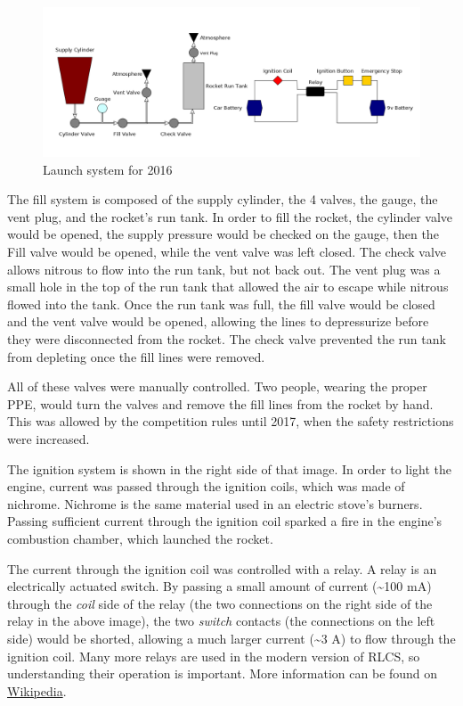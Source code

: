 \documentclass[11pt]{article}
\begin{document}
\begin{figure}[htbp]
\centering
\includegraphics[width=.9\linewidth]{./images/old_system.png}
\caption{\label{fig:orgc1b79f2}
Launch system for 2016}
\end{figure}

The fill system is composed of the supply cylinder, the 4 valves, the gauge, the
vent plug, and the rocket's run tank. In order to fill the rocket, the cylinder
valve would be opened, the supply pressure would be checked on the gauge, then
the Fill valve would be opened, while the vent valve was left closed. The check
valve allows nitrous to flow into the run tank, but not back out. The vent plug
was a small hole in the top of the run tank that allowed the air to escape while
nitrous flowed into the tank. Once the run tank was full, the fill valve would
be closed and the vent valve would be opened, allowing the lines to depressurize
before they were disconnected from the rocket. The check valve prevented the run
tank from depleting once the fill lines were removed.

All of these valves were manually controlled. Two people, wearing the proper
PPE, would turn the valves and remove the fill lines from the rocket by
hand. This was allowed by the competition rules until 2017, when the safety
restrictions were increased.

The ignition system is shown in the right side of that image. In order to light
the engine, current was passed through the ignition coils, which was made of
nichrome. Nichrome is the same material used in an electric stove's
burners. Passing sufficient current through the ignition coil sparked a fire in
the engine's combustion chamber, which launched the rocket.

The current through the ignition coil was controlled with a relay. A relay is
an electrically actuated switch. By passing a small amount of current (\textasciitilde{}100 mA) through
the \emph{coil} side of the relay (the two connections on the right side of the relay
in the above image), the two \emph{switch} contacts (the connections on the left
side) would be shorted, allowing a much larger current (\textasciitilde{}3 A) to flow through
the ignition coil. Many more relays are used in the modern version of RLCS, so
understanding their operation is important. More information can be found on
\href{https://en.wikipedia.org/wiki/Relay}{Wikipedia}.
\end{document}
